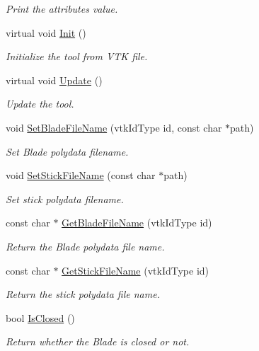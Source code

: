 \begin{DoxyCompactItemize}
\begin{DoxyCompactList}\small\item\em Print the attributes value. \item\end{DoxyCompactList}\item 
virtual void \hyperlink{classvtkToolScissors_a5fc5884ce0fd1723ecf86888bdbba7a6}{Init} ()
\begin{DoxyCompactList}\small\item\em Initialize the tool from VTK file. \item\end{DoxyCompactList}\item 
virtual void \hyperlink{classvtkToolScissors_afe574b6b9e809f746308a157b6525c4b}{Update} ()
\begin{DoxyCompactList}\small\item\em Update the tool. \item\end{DoxyCompactList}\item 
void \hyperlink{classvtkToolScissors_a7d769a793faf2cefaf2fd869a7d4d1e3}{SetBladeFileName} (vtkIdType id, const char $\ast$path)
\begin{DoxyCompactList}\small\item\em Set Blade polydata filename. \item\end{DoxyCompactList}\item 
void \hyperlink{classvtkToolScissors_a22475f67e31779d51b49af9a875269f7}{SetStickFileName} (const char $\ast$path)
\begin{DoxyCompactList}\small\item\em Set stick polydata filename. \item\end{DoxyCompactList}\item 
const char $\ast$ \hyperlink{classvtkToolScissors_a822f326f7203d378c73ea61de8636b25}{GetBladeFileName} (vtkIdType id)
\begin{DoxyCompactList}\small\item\em Return the Blade polydata file name. \item\end{DoxyCompactList}\item 
const char $\ast$ \hyperlink{classvtkToolScissors_ac99cbf90a47faba5527d4941688c7067}{GetStickFileName} (vtkIdType id)
\begin{DoxyCompactList}\small\item\em Return the stick polydata file name. \item\end{DoxyCompactList}\item 
\hypertarget{classvtkToolScissors_a3127e68830f39fa874bad5d3ab76c492}{
bool \hyperlink{classvtkToolScissors_a3127e68830f39fa874bad5d3ab76c492}{IsClosed} ()}
\label{classvtkToolScissors_a3127e68830f39fa874bad5d3ab76c492}

\begin{DoxyCompactList}\small\item\em Return whether the Blade is closed or not. \item\end{DoxyCompactList}\end{DoxyCompactItemize}
